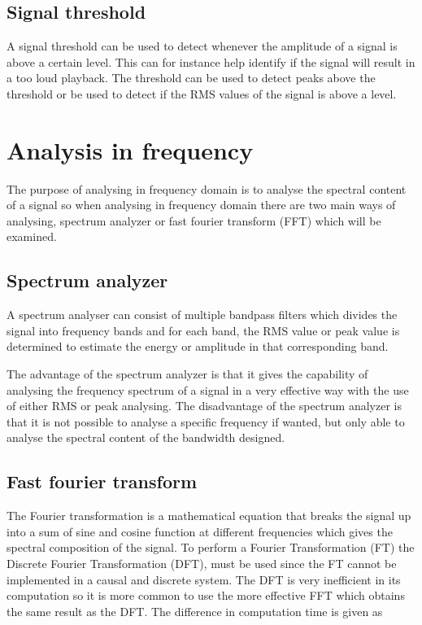 \subsection*{Signal threshold}
A signal threshold can be used to detect whenever the amplitude of a signal is above a certain level. This can for instance help identify if the signal will result in a too loud playback. The threshold can be used to detect peaks above the threshold or be used to detect if the RMS values of the signal is above a level.

\section{Analysis in frequency} \label{sec:SignalFreq}
The purpose of analysing in frequency domain is to analyse the spectral content of a signal so when analysing in frequency domain there are two main ways of analysing, spectrum analyzer or fast fourier transform (FFT) which will be examined.

\subsection*{Spectrum analyzer}
A spectrum analyser can consist of multiple bandpass filters which divides the signal into frequency bands and for each band, the RMS value or peak value is determined to estimate the energy or amplitude in that corresponding band. %

The advantage of the spectrum analyzer is that it gives the capability of analysing the frequency spectrum of a signal in a very effective way with the use of either RMS or peak analysing. The disadvantage of the spectrum analyzer is that it is not possible to analyse a specific frequency if wanted, but only able to analyse the spectral content of the bandwidth designed.      

\subsection*{Fast fourier transform}
The Fourier transformation is a mathematical equation that breaks the signal up into a sum of sine and cosine function at different frequencies which gives the spectral composition of the signal. To perform a Fourier Transformation (FT) the Discrete Fourier Transformation (DFT), must be used since the FT cannot be implemented in a causal and discrete system. The DFT is very inefficient in its computation so it is more common to use the more effective FFT which obtains the same result as the DFT. The difference in computation time is given as


